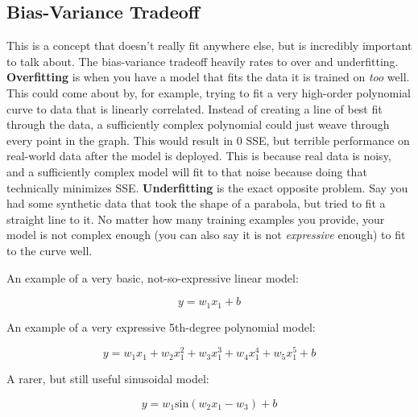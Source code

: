 \subsection{Bias-Variance Tradeoff}
\begin{flushleft}
    \large This is a concept that doesn't really fit anywhere else, but is incredibly important to talk about. The bias-variance tradeoff heavily rates to over and underfitting. \textbf{Overfitting} is when you have a model that fits the data it is trained on \textit{too} well. This could come about by, for example, trying to fit a very high-order polynomial curve to data that is linearly correlated. Instead of creating a line of best fit through the data, a sufficiently complex polynomial could just weave through every point in the graph. This would result in 0 SSE, but terrible performance on real-world data after the model is deployed. This is because real data is noisy, and a sufficiently complex model will fit to that noise because doing that technically minimizes SSE. \textbf{Underfitting} is the exact opposite problem. Say you had some synthetic data that took the shape of a parabola, but tried to fit a straight line to it. No matter how many training examples you provide, your model is not complex enough (you can also say it is not \textit{expressive} enough) to fit to the curve well. \break

    An example of a very basic, not-so-expressive linear model:

    $$y = w_1x_1 + b$$

    An example of a very expressive 5th-degree polynomial model:

    $$y = w_1x_1 + w_2x_1^2 + w_3x_1^3 + w_4x_1^4 + w_5x_1^5 + b$$

    A rarer, but still useful sinusoidal model:

    $$y = w_1\textrm{sin}(w_2x_1 - w_3) + b$$


\end{flushleft}
